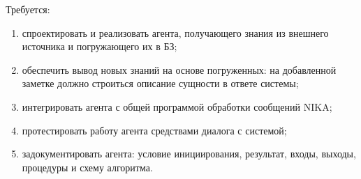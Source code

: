 Требуется:
\begin{enumerate}
	\item спроектировать и реализовать агента, получающего знания из внешнего источника и погружающего их в БЗ;
	\item обеспечить вывод новых знаний на основе погруженных: на добавленной заметке должно строиться описание сущности в ответе системы;
	\item интегрировать агента с общей программой обработки сообщений NIKA;
	\item протестировать работу агента средствами диалога с системой;
	\item задокументировать агента: условие инициирования, результат, входы, выходы, процедуры и схему алгоритма.
\end{enumerate}
